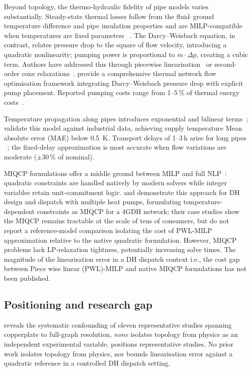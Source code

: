 \documentclass[a4paper,fleqn]{cas-dc}
\begin{document}
Beyond topology, the thermo-hydraulic fidelity of pipe models varies
substantially. Steady-state thermal losses follow from the
fluid--ground temperature difference and pipe insulation
properties and are MILP-compatible when
temperatures are fixed parameters ~\cite{Frederiksen2013}. The Darcy--Weisbach equation,
in contrast, relates pressure drop to the square of flow velocity,
introducing a quadratic nonlinearity; pumping power is proportional
to $\dot{m} \cdot \Delta p$, creating a cubic term. Authors have
addressed this through piecewise
linearisation~\cite{Bordin2016,Mertz2016} or second-order cone
relaxations~\cite{Blommaert2020}. \citet{Hari2024} provide a
comprehensive thermal network flow optimisation  framework
integrating Darcy--Weisbach pressure drop with explicit pump
placement. Reported pumping costs range from 1--5\,\% of thermal
energy costs~\cite{Frederiksen2013}.

Temperature propagation along pipes introduces exponential and
bilinear terms~\cite{vanderHeijde2017}; \citet{Maldonado2024}
validate this model against industrial data, achieving supply
temperature Mean absolute error (MAE) below \SI{0.5}{\kelvin}. Transport delays of 1--3\,h arise for
long pipes ~\cite{vanderHeijde2017,Giraud2015}; the
fixed-delay approximation is most accurate when flow variations
are moderate ($\pm 30\,\%$ of nominal).

MIQCP formulations offer a middle ground between MILP and full
NLP~\cite{Ommen2016}: quadratic constraints are handled natively
by modern solvers while integer variables retain unit-commitment
logic. \citet{Hering2021} and \citet{Hering2022} demonstrate this
approach for DH design and dispatch with multiple heat pumps,
formulating temperature-dependent constraints as MIQCP for a 4GDH
network; their case studies show the MIQCP remains tractable at the
scale of tens of consumers, but do not report a reference-model
comparison isolating the cost of PWL-MILP approximation relative to
the native quadratic formulation. However, MIQCP problems lack
LP-relaxation tightness, potentially increasing solve times. The
magnitude of the linearisation error in a DH dispatch context i.e.,
the cost gap between Piece wise linear (PWL)-MILP and native MIQCP
formulations has not been published.

\subsection{Positioning and research gap}
\label{sec:rw_summary}
 reveals the systematic confounding of
eleven representative studies spanning copperplate to full-graph
resolution, \emph{none} isolates topology from physics as an
independent experimental variable.
 positions representative studies. No prior work isolates topology from
physics, nor bounds linearisation error against a quadratic
reference in a controlled DH dispatch setting.
\end{document}

